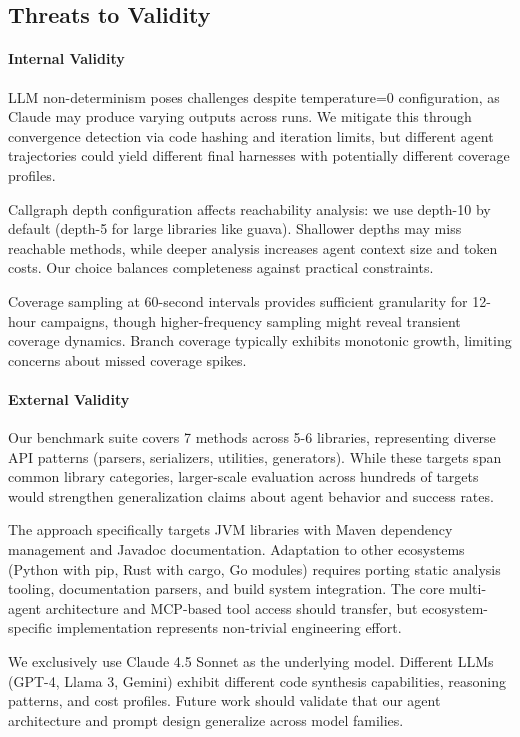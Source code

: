 \subsection{Threats to Validity}%
\label{subsec:threats}

\paragraph{Internal Validity}
LLM non-determinism poses challenges despite temperature=0 configuration, as Claude may produce varying outputs across runs. We mitigate this through convergence detection via code hashing and iteration limits, but different agent trajectories could yield different final harnesses with potentially different coverage profiles.

Callgraph depth configuration affects reachability analysis: we use depth-10 by default (depth-5 for large libraries like guava). Shallower depths may miss reachable methods, while deeper analysis increases agent context size and token costs. Our choice balances completeness against practical constraints.

Coverage sampling at 60-second intervals provides sufficient granularity for 12-hour campaigns, though higher-frequency sampling might reveal transient coverage dynamics. Branch coverage typically exhibits monotonic growth, limiting concerns about missed coverage spikes.

\paragraph{External Validity}
Our benchmark suite covers 7 methods across 5-6 libraries, representing diverse API patterns (parsers, serializers, utilities, generators). While these targets span common library categories, larger-scale evaluation across hundreds of targets would strengthen generalization claims about agent behavior and success rates.

The approach specifically targets JVM libraries with Maven dependency management and Javadoc documentation. Adaptation to other ecosystems (Python with pip, Rust with cargo, Go modules) requires porting static analysis tooling, documentation parsers, and build system integration. The core multi-agent architecture and MCP-based tool access should transfer, but ecosystem-specific implementation represents non-trivial engineering effort.

We exclusively use Claude 4.5 Sonnet as the underlying model. Different LLMs (GPT-4, Llama 3, Gemini) exhibit different code synthesis capabilities, reasoning patterns, and cost profiles. Future work should validate that our agent architecture and prompt design generalize across model families.

